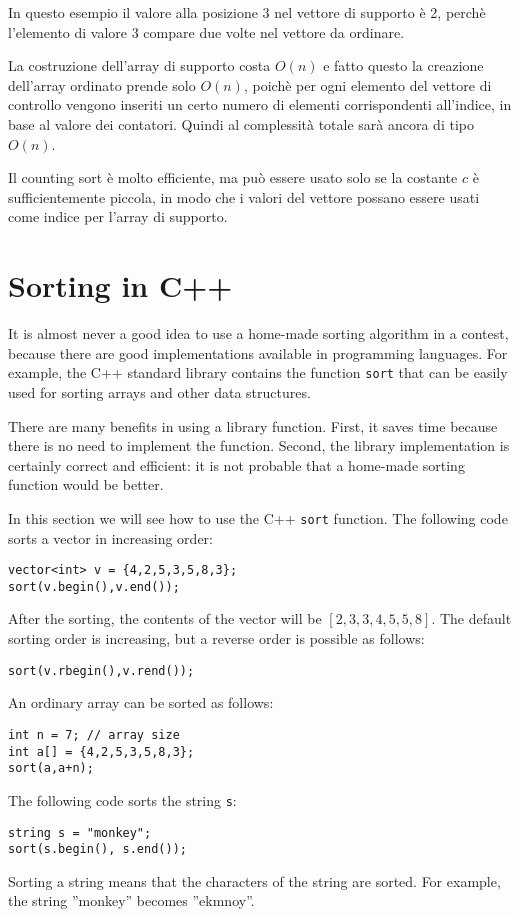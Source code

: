 In questo esempio il valore alla posizione 3
nel vettore di supporto è 2,
perchè l'elemento di valore 3 compare due volte
nel vettore da ordinare.

La costruzione dell'array di supporto costa
$O(n)$ e fatto questo la creazione dell'array ordinato
prende solo $O(n)$, poichè per ogni elemento del vettore
di controllo vengono inseriti un certo numero di elementi 
corrispondenti all'indice, in base al valore dei contatori.
Quindi al complessità totale sarà ancora di tipo $O(n)$.

Il counting sort è molto efficiente, ma può essere usato
solo se la costante $c$ è sufficientemente piccola, in modo 
che i valori del vettore possano essere usati come indice
per l'array di supporto.

\section{Sorting in C++}


It is almost never a good idea to use
a home-made sorting algorithm
in a contest, because there are good
implementations available in programming languages.
For example, the C++ standard library contains
the function \texttt{sort} that can be easily used for
sorting arrays and other data structures.

There are many benefits in using a library function.
First, it saves time because there is no need to
implement the function.
Second, the library implementation is
certainly correct and efficient: it is not probable
that a home-made sorting function would be better.

In this section we will see how to use the
C++ \texttt{sort} function.
The following code sorts
a vector in increasing order:
\begin{lstlisting}
vector<int> v = {4,2,5,3,5,8,3};
sort(v.begin(),v.end());
\end{lstlisting}
After the sorting, the contents of the
vector will be
$[2,3,3,4,5,5,8]$.
The default sorting order is increasing,
but a reverse order is possible as follows:
\begin{lstlisting}
sort(v.rbegin(),v.rend());
\end{lstlisting}
An ordinary array can be sorted as follows:
\begin{lstlisting}
int n = 7; // array size
int a[] = {4,2,5,3,5,8,3};
sort(a,a+n);
\end{lstlisting}
\newpage
The following code sorts the string \texttt{s}:
\begin{lstlisting}
string s = "monkey";
sort(s.begin(), s.end());
\end{lstlisting}
Sorting a string means that the characters
of the string are sorted.
For example, the string ''monkey'' becomes ''ekmnoy''.


